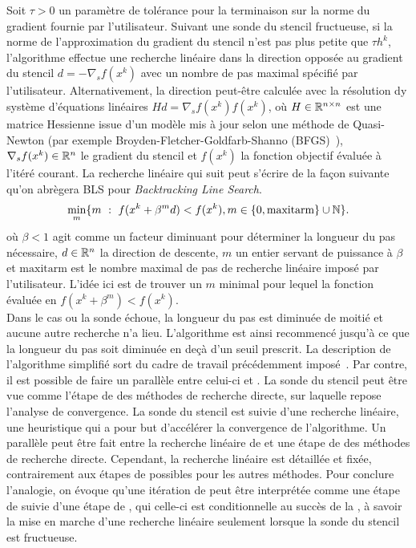 Soit $\tau > 0$ un paramètre de tolérance pour la terminaison sur la norme du gradient fournie par l'utilisateur. Suivant une sonde du stencil fructueuse, si la norme de l'approximation du gradient du stencil n'est pas plus petite que $\tau h^k$, l'algorithme effectue une recherche linéaire dans la direction opposée au gradient du stencil $ d = -\nabla_{s}f(x^k)$ avec un nombre de pas maximal spécifié par l'utilisateur. Alternativement, la direction peut-être calculée avec la résolution dy système d'équations linéaires $Hd = \nabla_{s}f(x^k)f(x^k)$, où $H \in \mathbb{R}^{n\times n}$ est une matrice Hessienne issue d'un modèle mis à jour selon une méthode de Quasi-Newton (par exemple Broyden-Fletcher-Goldfarb-Shanno (BFGS)~\cite{Broy65a,Flet65a}),$\nabla_{s}f(x^k) \in \mathbb{R}^n$ le gradient du stencil et $f(x^k)$ la fonction objectif évaluée à l'itéré courant. La recherche linéaire qui suit peut s'écrire de la façon suivante qu'on abrègera \textsf{BLS} pour \textit{Backtracking Line Search}. 
\begin{gather}
\underset{m}{\min}\{m~:~f(x^k+\beta^m d) < f(x^k),m \in \{0,\text{maxitarm}\}\cup\mathbb{N}\}.
\end{gather}
où $\beta< 1$ agit comme un facteur diminuant pour déterminer la longueur du pas nécessaire, $d \in \mathbb{R}^n$ la direction de descente, $m$ un entier servant de puissance à $\beta$ et  $\text{maxitarm}$ est le nombre maximal de pas de recherche linéaire imposé par l'utilisateur. L'idée ici est de trouver un $m$ minimal pour lequel la fonction évaluée en $f(x^k+\beta^m)<f(x^k)$.\\
Dans le cas ou la sonde échoue, la longueur du pas est diminuée de moitié et aucune autre recherche n'a lieu. L'algorithme est ainsi recommencé jusqu'à ce que la longueur du pas soit diminuée en deçà d'un seuil prescrit. La description de l'algorithme simplifié sort du cadre de travail précédemment imposé~\cite{BoDeFrSeToTr99a}. Par contre, il est possible de faire un parallèle entre celui-ci et \imfil. La sonde du stencil peut être vue comme l'étape de \POLL des méthodes de recherche directe, sur laquelle repose l'analyse de convergence. La sonde du stencil est suivie d'une recherche linéaire, une heuristique qui a pour but d'accélérer la convergence de l'algorithme. Un parallèle peut être fait entre la recherche linéaire de \imfil et une étape de \SEARCH des méthodes de recherche directe. Cependant, la recherche linéaire est détaillée et fixée, contrairement aux étapes de \SEARCH possibles pour les autres méthodes. Pour conclure l'analogie, on évoque qu'une itération de \imfil peut être interprétée comme une étape de \POLL suivie d'une étape de \SEARCH, qui celle-ci est conditionnelle au succès de la \POLL, à savoir la mise en marche d'une recherche linéaire seulement lorsque la sonde du stencil est fructueuse.
